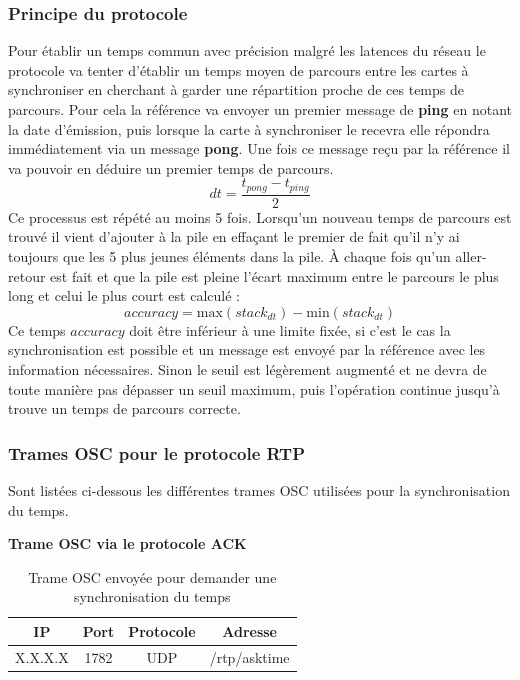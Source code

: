 \subsubsection{Principe du protocole}
Pour établir un temps commun avec précision malgré les latences du réseau le protocole va tenter d'établir un temps moyen de parcours entre les cartes à synchroniser en cherchant à garder une répartition proche de ces temps de parcours.\p
Pour cela la référence va envoyer un premier message de \textbf{ping} en notant la date d'émission, puis lorsque la carte à synchroniser le recevra elle répondra immédiatement via un message \textbf{pong}. Une fois ce message reçu par la référence il va pouvoir en déduire un premier temps de parcours.
\[ dt = \dfrac{t_{pong} - t_{ping}}{2} \]
Ce processus est répété au moins 5 fois. Lorsqu'un nouveau temps de parcours est trouvé il vient d'ajouter à la pile en effaçant le premier de fait qu'il n'y ai toujours que les 5 plus jeunes éléments dans la pile.\p
À chaque fois qu'un aller-retour est fait et que la pile est pleine l'écart maximum entre le parcours le plus long et celui le plus court est calculé :
\[ accuracy = \text{max}(stack_{dt}) - \text{min}(stack_{dt}) \]
Ce temps $accuracy$ doit être inférieur à une limite fixée, si c'est le cas la synchronisation est possible et un message est envoyé par la référence avec les information nécessaires. Sinon le seuil est légèrement augmenté et ne devra de toute manière pas dépasser un seuil maximum, puis l'opération continue jusqu'à trouve un temps de parcours correcte.

\subsubsection{Trames OSC pour le protocole RTP}

Sont listées ci-dessous les différentes trames OSC utilisées pour la synchronisation du temps.

\begin{table}[htbp]
\centering
{
\textbf{Trame OSC via le protocole ACK}\vspace{8pt}~\\
\begin{tabularx}{0.85\textwidth}{|c|c|c|C|}
\hline
\textbf{IP} & \textbf{Port} & \textbf{Protocole} & \textbf{Adresse}  \tabularnewline
\hline
\hline
X.X.X.X\footnotemark & 1782 & UDP & /rtp/asktime \tabularnewline
\hline
\end{tabularx}
}
\label{tab:trame_asktime}
\caption{Trame OSC envoyée pour demander une synchronisation du temps}
\vspace{-5pt}
\end{table}
\newpage

